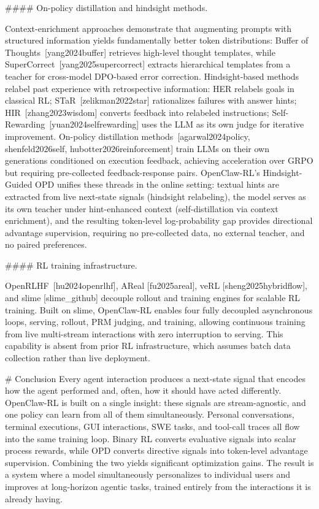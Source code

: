 #### On-policy distillation and hindsight methods.

Context-enrichment approaches demonstrate that augmenting prompts with structured information yields fundamentally better token distributions: Buffer of Thoughts [yang2024buffer] retrieves high-level thought templates, while SuperCorrect [yang2025supercorrect] extracts hierarchical templates from a teacher for cross-model DPO-based error correction. Hindsight-based methods relabel past experience with retrospective information: HER relabels goals in classical RL; STaR [zelikman2022star] rationalizes failures with answer hints; HIR [zhang2023wisdom] converts feedback into relabeled instructions; Self-Rewarding [yuan2024selfrewarding] uses the LLM as its own judge for iterative improvement. On-policy distillation methods [agarwal2024policy, shenfeld2026self, hubotter2026reinforcement] train LLMs on their own generations conditioned on execution feedback, achieving acceleration over GRPO but requiring pre-collected feedback-response pairs. OpenClaw-RL's Hindsight-Guided OPD unifies these threads in the online setting: textual hints are extracted from live next-state signals (hindsight relabeling), the model serves as its own teacher under hint-enhanced context (self-distillation via context enrichment), and the resulting token-level log-probability gap provides directional advantage supervision, requiring no pre-collected data, no external teacher, and no paired preferences.

#### RL training infrastructure.

OpenRLHF [hu2024openrlhf], AReal [fu2025areal], veRL [sheng2025hybridflow], and slime [slime_github] decouple rollout and training engines for scalable RL training. Built on slime, OpenClaw-RL enables four fully decoupled asynchronous loops, serving, rollout, PRM judging, and training, allowing continuous training from live multi-stream interactions with zero interruption to serving. This capability is absent from prior RL infrastructure, which assumes batch data collection rather than live deployment.

# Conclusion
Every agent interaction produces a next-state signal that encodes how the agent performed and, often, how it should have acted differently. OpenClaw-RL is built on a single insight: these signals are stream-agnostic, and one policy can learn from all of them simultaneously. Personal conversations, terminal executions, GUI interactions, SWE tasks, and tool-call traces all flow into the same training loop. Binary RL converts evaluative signals into scalar process rewards, while OPD converts directive signals into token-level advantage supervision. Combining the two yields significant optimization gains. The result is a system where a model simultaneously personalizes to individual users and improves at long-horizon agentic tasks, trained entirely from the interactions it is already having.

